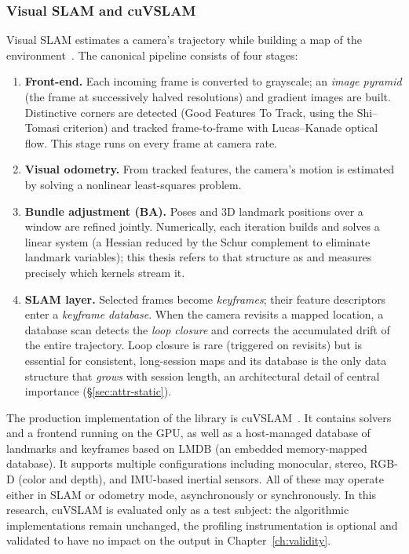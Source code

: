 \subsubsection{Visual SLAM and cuVSLAM}\label{sec:bg-slam}

Visual SLAM estimates a camera's trajectory while building a map of the environment~\cite{cadena2016slam,durrant2006slam}. The canonical pipeline consists of four stages:

\begin{enumerate}

\item \textbf{Front-end.} Each incoming frame is converted to grayscale; an \emph{image pyramid} (the frame at successively halved resolutions) and gradient images are built. Distinctive corners are detected (Good Features To Track, using the Shi--Tomasi criterion) and tracked frame-to-frame with Lucas--Kanade optical flow. This stage runs on every frame at camera rate.

\item \textbf{Visual odometry.} From tracked features, the camera's motion is estimated by solving a nonlinear least-squares problem.

\item \textbf{Bundle adjustment (BA).} Poses and 3D landmark positions over a window are refined jointly. Numerically, each iteration builds and solves a linear system (a Hessian reduced by the Schur complement to eliminate landmark variables); this thesis refers to that structure as  and measures precisely which kernels stream it.

\item \textbf{SLAM layer.} Selected frames become \emph{keyframes}; their feature descriptors enter a \emph{keyframe database}. When the camera revisits a mapped location, a database scan detects the \emph{loop closure} and corrects the accumulated drift of the entire trajectory. Loop closure is rare (triggered on revisits) but is essential for consistent, long-session maps and its database is the only data structure that \emph{grows} with session length, an architectural detail of central importance (\S\ref{sec:attr-static}).

\end{enumerate}

The production implementation of the library is cuVSLAM~\cite{cuvslam2025}. It contains solvers and a frontend running on the GPU, as well as a host-managed database of landmarks and keyframes based on LMDB (an embedded memory-mapped database). It supports multiple configurations including monocular, stereo, RGB-D (color and depth), and IMU-based inertial sensors. All of these may operate either in SLAM or odometry mode, asynchronously or synchronously. In this research, cuVSLAM is evaluated only as a test subject: the algorithmic implementations remain unchanged, the profiling instrumentation is optional and validated to have no impact on the output in Chapter~\ref{ch:validity}.

